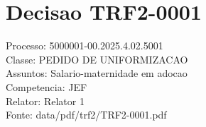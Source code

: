 \documentclass[12pt]{article}
\begin{document}
\section*{Decisao TRF2-0001}
Processo: 5000001-00.2025.4.02.5001\\
Classe: PEDIDO DE UNIFORMIZACAO\\
Assuntos: Salario-maternidade em adocao\\
Competencia: JEF\\
Relator: Relator 1\\
Fonte: data/pdf/trf2/TRF2-0001.pdf
\end{document}
